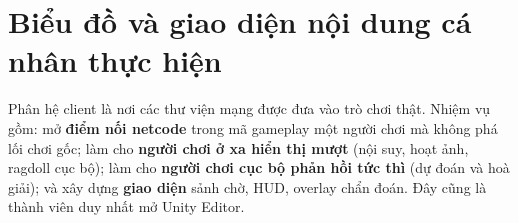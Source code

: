 
\newcommand{\uiN}[3]{\node[circle, fill=uiRed, text=white, inner sep=0pt, minimum size=11pt, font=\tiny\bfseries] at (#1,#2) {#3};}


\section{Biểu đồ và giao diện nội dung cá nhân thực hiện}
Phân hệ client là nơi các thư viện mạng được đưa vào trò chơi thật. Nhiệm vụ gồm: mở \textbf{điểm nối netcode}
trong mã gameplay một người chơi mà không phá lối chơi gốc; làm cho \textbf{người chơi ở xa hiển thị mượt} (nội suy,
hoạt ảnh, ragdoll cục bộ); làm cho \textbf{người chơi cục bộ phản hồi tức thì} (dự đoán và hoà giải); và xây dựng
\textbf{giao diện} sảnh chờ, HUD, overlay chẩn đoán. Đây cũng là thành viên duy nhất mở Unity Editor.

